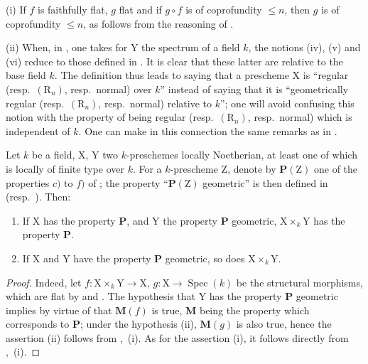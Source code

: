 \begin{remarks}[6.8.4]
\label{IV.6.8.4}
(i) If $f$ is faithfully flat, $g$ flat and if $g\circ f$ is of coprofundity $\leqslant n$, then $g$ is of coprofundity $\leqslant n$, as follows from the reasoning of .

(ii) When, in , one takes for $\mathrm{Y}$ the spectrum of a field $k$, the notions (iv), (v) and (vi) reduce to those defined in . It is clear that these latter are relative to the base field $k$. The definition  thus leads to saying that a prescheme $\mathrm{X}$ is ``regular (resp.\ $(\mathrm{R}_n)$, resp.\ normal) over $k$'' instead of saying that it is ``geometrically regular (resp.\ $(\mathrm{R}_n)$, resp.\ normal) relative to $k$''; one will avoid confusing this notion with the property of being regular (resp.\ $(\mathrm{R}_n)$, resp.\ normal) which is independent of $k$. One can make in this connection the same remarks as in .
\end{remarks}

\begin{proposition}[6.8.5]
\label{IV.6.8.5}
Let $k$ be a field, $\mathrm{X}$, $\mathrm{Y}$ two $k$-preschemes locally Noetherian, at least one of which is locally of finite type over $k$. For a $k$-prescheme $\mathrm{Z}$, denote by $\boldsymbol{P}(\mathrm{Z})$ one of the properties $c)$ to $f)$ of ; the property ``$\boldsymbol{P}(\mathrm{Z})$ geometric'' is then defined in  (resp.\ ). Then:
\begin{enumerate}[label=(\roman*)]
  \item If $\mathrm{X}$ has the property $\boldsymbol{P}$, and $\mathrm{Y}$ the property $\boldsymbol{P}$ geometric, $\mathrm{X}\times_k\mathrm{Y}$ has the property $\boldsymbol{P}$.
  \item If $\mathrm{X}$ and $\mathrm{Y}$ have the property $\boldsymbol{P}$ geometric, so does $\mathrm{X}\times_k\mathrm{Y}$.
\end{enumerate}
\end{proposition}

\begin{proof}
Indeed, let $f:\mathrm{X}\times_k\mathrm{Y}\to\mathrm{X}$, $g:\mathrm{X}\to\operatorname{Spec}(k)$ be the structural morphisms, which are flat by  and . The hypothesis that $\mathrm{Y}$ has the property $\boldsymbol{P}$ geometric implies by virtue of  that $\boldsymbol{M}(f)$ is true, $\boldsymbol{M}$ being the property  which corresponds to $\boldsymbol{P}$; under the hypothesis (ii), $\boldsymbol{M}(g)$ is also true, hence the assertion (ii) follows from ,~(i). As for the assertion (i), it follows directly from ,~(i).
\end{proof}

